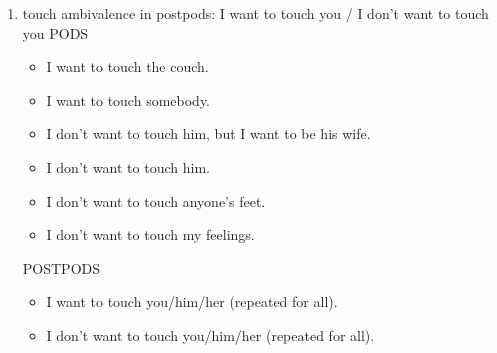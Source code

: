 \documentclass[11pt]{article}
\begin{document}
\begin{enumerate}
\begin{enumerate}
POSTPODS
\begin{itemize}
\item Touching you with my voice, you're not blinking.
\item Touching you and your soul with everything that's happened.
\item Touching you, I felt the connection that we had.
\item Touching you, I feel like we're in a perfect spot.
\item Touching you, I literally feel like I'm in love.
\item Touching you, I'm getting a little emotional.
\item Touching you is everything I've ever wanted.
\item Touching you like that, we're ready.
\item Touching you, I feel like I'm ready.
\item Touching you is my wish.
\end{itemize}

\item touch ambivalence in postpods: I want to touch you / I don't want to touch you
\label{sec:org4e48955}
PODS
\begin{itemize}
\item I want to touch the couch.
\item I want to touch somebody.
\item I don't want to touch him, but I want to be his wife.
\item I don't want to touch him.
\item I don't want to touch anyone's feet.
\item I don't want to touch my feelings.
\end{itemize}

POSTPODS
\begin{itemize}
\item I want to touch you/him/her (repeated for all).
\item I don't want to touch you/him/her (repeated for all).
\end{itemize}
\end{enumerate}




\end{enumerate}
\end{document}
